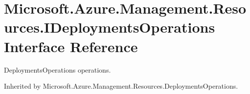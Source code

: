 \hypertarget{interface_microsoft_1_1_azure_1_1_management_1_1_resources_1_1_i_deployments_operations}{}\section{Microsoft.\+Azure.\+Management.\+Resources.\+I\+Deployments\+Operations Interface Reference}
\label{interface_microsoft_1_1_azure_1_1_management_1_1_resources_1_1_i_deployments_operations}


Deployments\+Operations operations.  




Inherited by Microsoft.\+Azure.\+Management.\+Resources.\+Deployments\+Operations.

